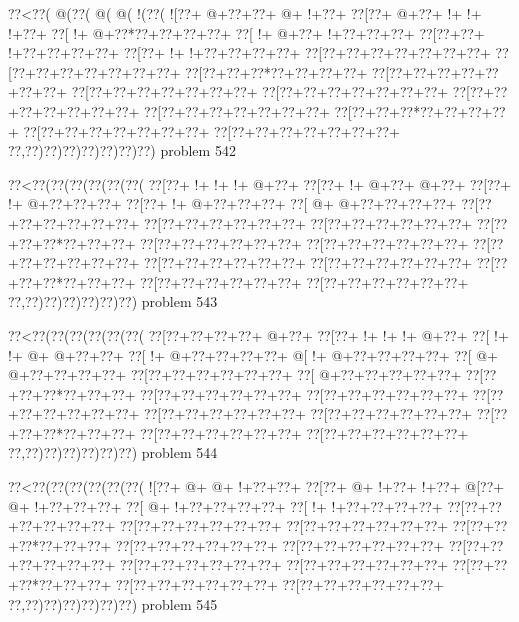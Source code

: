 \vbox{\vbox{\goo
\0??<\0??(\- @(\0??(\- @(\- @(\- !(\0??(
\- ![\0??+\- @+\0??+\0??+\- @+\- !+\0??+
\0??[\0??+\- @+\0??+\- !+\- !+\- !+\0??+
\0??[\- !+\- @+\0??*\0??+\0??+\0??+\0??+
\0??[\- !+\- @+\0??+\- !+\0??+\0??+\0??+
\0??[\0??+\0??+\- !+\0??+\0??+\0??+\0??+
\0??[\0??+\- !+\- !+\0??+\0??+\0??+\0??+
\0??[\0??+\0??+\0??+\0??+\0??+\0??+\0??+
\0??[\0??+\0??+\0??+\0??+\0??+\0??+\0??+
\0??[\0??+\0??+\0??*\0??+\0??+\0??+\0??+
\0??[\0??+\0??+\0??+\0??+\0??+\0??+\0??+
\0??[\0??+\0??+\0??+\0??+\0??+\0??+\0??+
\0??[\0??+\0??+\0??+\0??+\0??+\0??+\0??+
\0??[\0??+\0??+\0??+\0??+\0??+\0??+\0??+
\0??[\0??+\0??+\0??+\0??+\0??+\0??+\0??+
\0??[\0??+\0??+\0??*\0??+\0??+\0??+\0??+
\0??[\0??+\0??+\0??+\0??+\0??+\0??+\0??+
\0??[\0??+\0??+\0??+\0??+\0??+\0??+\0??+
\0??,\0??)\0??)\0??)\0??)\0??)\0??)\0??)
}
\hfil problem 542\hfil\break
}

\vbox{\vbox{\goo
\0??<\0??(\0??(\0??(\0??(\0??(\0??(
\0??[\0??+\- !+\- !+\- !+\- @+\0??+
\0??[\0??+\- !+\- @+\0??+\- @+\0??+
\0??[\0??+\- !+\- @+\0??+\0??+\0??+
\0??[\0??+\- !+\- @+\0??+\0??+\0??+
\0??[\- @+\- @+\0??+\0??+\0??+\0??+
\0??[\0??+\0??+\0??+\0??+\0??+\0??+
\0??[\0??+\0??+\0??+\0??+\0??+\0??+
\0??[\0??+\0??+\0??+\0??+\0??+\0??+
\0??[\0??+\0??+\0??*\0??+\0??+\0??+
\0??[\0??+\0??+\0??+\0??+\0??+\0??+
\0??[\0??+\0??+\0??+\0??+\0??+\0??+
\0??[\0??+\0??+\0??+\0??+\0??+\0??+
\0??[\0??+\0??+\0??+\0??+\0??+\0??+
\0??[\0??+\0??+\0??+\0??+\0??+\0??+
\0??[\0??+\0??+\0??*\0??+\0??+\0??+
\0??[\0??+\0??+\0??+\0??+\0??+\0??+
\0??[\0??+\0??+\0??+\0??+\0??+\0??+
\0??,\0??)\0??)\0??)\0??)\0??)\0??)
}
\hfil problem 543\hfil\break
}

\vbox{\vbox{\goo
\0??<\0??(\0??(\0??(\0??(\0??(\0??(
\0??[\0??+\0??+\0??+\0??+\- @+\0??+
\0??[\0??+\- !+\- !+\- !+\- @+\0??+
\0??[\- !+\- !+\- @+\- @+\0??+\0??+
\0??[\- !+\- @+\0??+\0??+\0??+\0??+
\- @[\- !+\- @+\0??+\0??+\0??+\0??+
\0??[\- @+\- @+\0??+\0??+\0??+\0??+
\0??[\0??+\0??+\0??+\0??+\0??+\0??+
\0??[\- @+\0??+\0??+\0??+\0??+\0??+
\0??[\0??+\0??+\0??*\0??+\0??+\0??+
\0??[\0??+\0??+\0??+\0??+\0??+\0??+
\0??[\0??+\0??+\0??+\0??+\0??+\0??+
\0??[\0??+\0??+\0??+\0??+\0??+\0??+
\0??[\0??+\0??+\0??+\0??+\0??+\0??+
\0??[\0??+\0??+\0??+\0??+\0??+\0??+
\0??[\0??+\0??+\0??*\0??+\0??+\0??+
\0??[\0??+\0??+\0??+\0??+\0??+\0??+
\0??[\0??+\0??+\0??+\0??+\0??+\0??+
\0??,\0??)\0??)\0??)\0??)\0??)\0??)
}
\hfil problem 544\hfil\break
}

\vbox{\vbox{\goo
\0??<\0??(\0??(\0??(\0??(\0??(\0??(
\- ![\0??+\- @+\- @+\- !+\0??+\0??+
\0??[\0??+\- @+\- !+\0??+\- !+\0??+
\- @[\0??+\- @+\- !+\0??+\0??+\0??+
\0??[\- @+\- !+\0??+\0??+\0??+\0??+
\0??[\- !+\- !+\0??+\0??+\0??+\0??+
\0??[\0??+\0??+\0??+\0??+\0??+\0??+
\0??[\0??+\0??+\0??+\0??+\0??+\0??+
\0??[\0??+\0??+\0??+\0??+\0??+\0??+
\0??[\0??+\0??+\0??*\0??+\0??+\0??+
\0??[\0??+\0??+\0??+\0??+\0??+\0??+
\0??[\0??+\0??+\0??+\0??+\0??+\0??+
\0??[\0??+\0??+\0??+\0??+\0??+\0??+
\0??[\0??+\0??+\0??+\0??+\0??+\0??+
\0??[\0??+\0??+\0??+\0??+\0??+\0??+
\0??[\0??+\0??+\0??*\0??+\0??+\0??+
\0??[\0??+\0??+\0??+\0??+\0??+\0??+
\0??[\0??+\0??+\0??+\0??+\0??+\0??+
\0??,\0??)\0??)\0??)\0??)\0??)\0??)
}
\hfil problem 545\hfil\break
}

